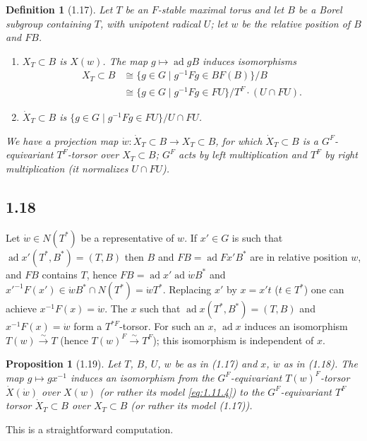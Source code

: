 \documentclass[11pt]{amsart}
\theoremstyle{plain}
\newtheorem{proposition}[theorem]{Proposition}
\newtheorem{definition}[theorem]{Definition}
\theoremstyle{remark}
\DeclareMathOperator{\ad}{ad}
\begin{document}
\begin{definition}[1.17]
Let $T$ be an $F$-stable maximal torus and let $B$ be a Borel subgroup containing $T$, with unipotent radical $U$; let $w$ be the relative position of $B$ and $FB$.
\begin{enumerate}
\item[(i)] $X_T \subset B$ is $X(w)$. The map $g \mapsto \ad g B$ induces isomorphisms
\begin{align*}
X_T \subset B &\cong \{g \in G \mid g^{-1}Fg \in BF(B)\}/B \\
&\cong \{g \in G \mid g^{-1}Fg \in FU\}/T^F \cdot (U \cap FU).
\end{align*}
\item[(ii)] $\dot{X}_T \subset B$ is $\{g \in G \mid g^{-1}Fg \in FU\}/U \cap FU$.
\end{enumerate}
We have a projection map $\dot{w}: \dot{X}_T \subset B \to X_T \subset B$, for which $\dot{X}_T \subset B$ is a $G^F$-equivariant $T^F$-torsor over $X_T \subset B$; $G^F$ acts by left multiplication and $T^F$ by right multiplication (it normalizes $U \cap FU$).
\end{definition}

\subsection{1.18} Let $\dot{w} \in N(T^*)$ be a representative of $w$. If $x' \in G$ is such that $\ad x'(T^*, B^*) = (T, B)$ then $B$ and $FB = \ad Fx' B^*$ are in relative position $w$, and $FB$ contains $T$, hence $FB = \ad x' \ad\dot{w} B^*$ and $x'^{-1}F(x') \in \dot{w}B^* \cap N(T^*) = \dot{w}T^*$. Replacing $x'$ by $x = x't$ ($t \in T^*$) one can achieve $x^{-1}F(x) = \dot{w}$. The $x$ such that $\ad x(T^*, B^*) = (T, B)$ and $x^{-1}F(x) = \dot{w}$ form a $T^{*F}$-torsor. For such an $x$, $\ad x$ induces an isomorphism $T(w) \xrightarrow{\sim} T$ (hence $T(w)^F \xrightarrow{\sim} T^F$); this isomorphism is independent of $x$.

\begin{proposition}[1.19]
Let $T$, $B$, $U$, $w$ be as in (1.17) and $x$, $\dot{w}$ as in (1.18). The map $g \mapsto gx^{-1}$ induces an isomorphism from the $G^F$-equivariant $T(w)^F$-torsor $\dot{X}(\dot{w})$ over $X(w)$ (or rather its model \eqref{eq:1.11.4}) to the $G^F$-equivariant $T^F$ torsor $\dot{X}_T \subset B$ over $X_T \subset B$ (or rather its model (1.17)).
\end{proposition}

This is a straightforward computation.
\end{document}
